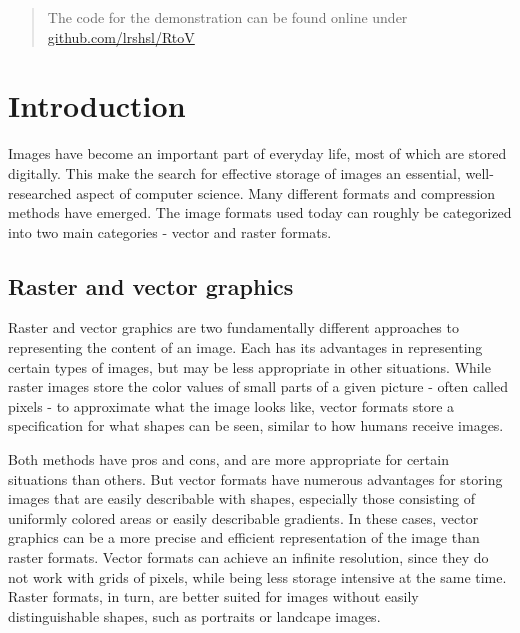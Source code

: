 \documentclass[12pt, a4paper, titlepage]{report}
\begin{document}
\begin{titlepage}
\begin{abstract}
       \vspace{1cm}
       The code for the demonstration can be found online under \href{https://github.com/lrshsl/RtoV}{github.com/lrshsl/RtoV}
    \end{abstract}

\end{titlepage}



\tableofcontents





\chapter{Introduction}

Images have become an important part of everyday life, most of which are stored digitally. This make the search for effective storage of images an essential, well-researched aspect of computer science.
Many different formats and compression methods have emerged. The image formats used today can roughly be categorized into two main categories - vector and raster formats.

\section{Raster and vector graphics}

Raster and vector graphics are two fundamentally different approaches to representing the content of an image. Each has its advantages in representing certain types of images, but may be less appropriate in other situations. While raster images store the color values of small parts of a given picture - often called pixels - to approximate what the image looks like, vector formats store a specification for what shapes can be seen, similar to how humans receive images.

Both methods have pros and cons, and are more appropriate for certain situations than others. But vector formats have numerous advantages for storing images that are easily describable with shapes, especially those consisting of uniformly colored areas or easily describable gradients. In these cases, vector graphics can be a more precise and efficient representation of the image than raster formats. Vector formats can achieve an infinite resolution, since they do not work with grids of pixels, while being less storage intensive at the same time. Raster formats, in turn, are better suited for images without easily distinguishable shapes, such as portraits or landcape images.
\end{document}
